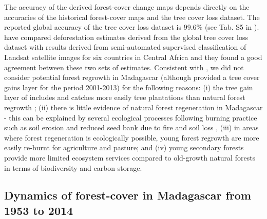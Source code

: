 \documentclass[a4paper, 12pt, leqno]{article} %
\begin{document}
The accuracy of the derived forest-cover change maps depends directly on
the accuracies of the historical forest-cover maps and the tree cover
loss dataset. The reported global accuracy of the tree cover loss
dataset is 99.6\% (see Tab. S5 in \citet{Hansen2013}).
\citet{Verhegghen2016} have compared deforestation estimates derived
from the global tree cover loss dataset \citep{Hansen2013} with results
derived from semi-automated supervised classification of Landsat
satellite images \citep{Achard2014} for six countries in Central Africa
and they found a good agreement between these two sets of estimates.
Consistent with \citet{Harper2007}, we did not consider potential forest
regrowth in Madagascar (although \citet{Hansen2013} provided a tree
cover gains layer for the period 2001-2013) for the following reasons:
(i) the tree gain layer of \citet{Hansen2013} includes and catches more
easily tree plantations than natural forest regrowth \citep{Tropek2014};
(ii) there is little evidence of natural forest regeneration in
Madagascar \citep[\citet{Grouzis2001}]{Harper2007} - this can be
explained by several ecological processes following burning practice
such as soil erosion \citep{Grinand2017} and reduced seed bank due to
fire and soil loss \citep{Grouzis2001}, (iii) in areas where forest
regeneration is ecologically possible, young forest regrowth are more
easily re-burnt for agriculture and pasture; and (iv) young secondary
forests provide more limited ecosystem services compared to old-growth
natural forests in terms of biodiversity and carbon storage.

\subsection{Dynamics of forest-cover in Madagascar from 1953 to 2014}
\end{document}
